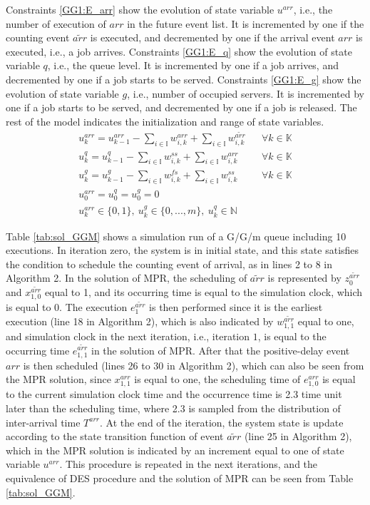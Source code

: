 \documentclass[]{interact}
\theoremstyle{plain}%
\theoremstyle{definition}
\theoremstyle{remark}
\begin{document}
Constraints \eqref{GG1:E_arr} show the evolution of state variable $u^{arr}$, i.e., the number of execution of ${arr}$ in the future event list. It is incremented by one if the counting event ${\tilde{arr}}$ is executed, and decremented by one if the arrival event ${arr}$ is executed, i.e., a job arrives. 
Constraints \eqref{GG1:E_q} show the evolution of state variable $q$, i.e., the queue level. It is incremented by one if a job arrives, and decremented by one if a job starts to be served. 
Constraints \eqref{GG1:E_g} show the evolution of state variable $g$, i.e., number of occupied servers. It is incremented by one if a job starts to be served, and decremented by one if a job is released. The rest of the model indicates the initialization and range of state variables.
\begin{eqnarray}
u^{arr}_k = u^{arr}_{k-1} - \sum_{i\in\mathbb{I}}w^{arr}_{i,k} +\sum_{i\in\mathbb{I}} w^{\tilde{arr}}_{i,k}&&\forall k \in \mathbb{K} \label{GG1:E_arr}\\
u^{q}_k = u^{q}_{k-1} - \sum_{i\in\mathbb{I}}w^{ss}_{i,k} + \sum_{i\in\mathbb{I}}w^{arr}_{i,k}&&\forall k \in \mathbb{K}\label{GG1:E_q}\\
u^{g}_k = u^{g}_{k-1} - \sum_{i\in\mathbb{I}}w^{fs}_{i,k} + \sum_{i\in\mathbb{I}}w^{ss}_{i,k}&&\forall k \in \mathbb{K}\label{GG1:E_g}\\
u^{arr}_0=u^q_0=u^g_0=0\nonumber\\
u^{arr}_{k}\in\{0,1\},\ u^g_{k}\in\{0,...,m\},\ u^{q}_k\in \mathbb{N}\nonumber
\end{eqnarray}


Table \ref{tab:sol_GGM} shows a simulation run of a G/G/m queue including 10 executions. In iteration zero, the system is in initial state, and this state satisfies the condition to schedule the counting event of arrival, as in lines 2 to 8 in Algorithm 2. In the solution of MPR, the scheduling of $\tilde{arr}$ is represented by $z^{\tilde{arr}}_0$ and $x^{\tilde{arr}}_{1,0}$ equal to 1, and its occurring time is equal to the simulation clock, which is equal to 0. The execution $e^{\tilde{arr}}_1$ is then performed since it is the earliest execution (line 18 in Algorithm 2), which is also indicated by $w^{\tilde{arr}}_{1,1}$ equal to one, and simulation clock in the next iteration, i.e., iteration $1$, is equal to the occurring time $e^{\tilde{arr}}_{1,1}$ in the solution of MPR. After that the positive-delay event $arr$ is then scheduled (lines 26 to 30 in Algorithm 2), which can also be seen from the MPR solution, since $x^{arr}_{1,1}$ is equal to one, the scheduling time of $e^{arr}_{1,0}$ is equal to the current simulation clock time and the occurrence time is 2.3 time unit later than the scheduling time, where 2.3 is sampled from the distribution of inter-arrival time $T^{arr}$. At the end of the iteration, the system state is update according to the state transition function of event $\tilde{arr}$ (line 25 in Algorithm 2), which in the MPR solution is indicated by an increment equal to one of state variable $u^{arr}$. This procedure is repeated in the next iterations, and the equivalence of DES procedure and the solution of MPR can be seen from Table \ref{tab:sol_GGM}. 
\end{document}
